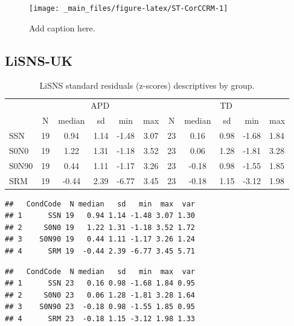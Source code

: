 \documentclass[a4paper, twoside]{templates/ociamthesis}
\begin{document}
\begin{figure}

{\centering \texttt{[image: \_main\_files/figure-latex/ST-CorCCRM-1]} 

}

\caption{Add caption here.}\label{fig:ST-CorCCRM}
\end{figure}

\hypertarget{lisns-uk}{%
\subsection{LiSNS-UK}\label{lisns-uk}}

\begin{table}

\caption{\label{tab:LiSNS-ztab}LiSNS standard residuals (z-scores) descriptives by group.}
\centering
\begin{tabular}[t]{lccccc|>{}ccccl}
\toprule
\multicolumn{1}{c}{ } & \multicolumn{5}{c}{APD} & \multicolumn{5}{c}{TD} \\
\cmidrule(l{3pt}r{3pt}){2-6} \cmidrule(l{3pt}r{3pt}){7-11}
 & N & median & sd & min & max & N & median & sd & min & max\\
\midrule
SSN & 19 & 0.94 & 1.14 & -1.48 & 3.07 & 23 & 0.16 & 0.98 & -1.68 & 1.84\\
S0N0 & 19 & 1.22 & 1.31 & -1.18 & 3.52 & 23 & 0.06 & 1.28 & -1.81 & 3.28\\
S0N90 & 19 & 0.44 & 1.11 & -1.17 & 3.26 & 23 & -0.18 & 0.98 & -1.55 & 1.85\\
SRM & 19 & -0.44 & 2.39 & -6.77 & 3.45 & 23 & -0.18 & 1.15 & -3.12 & 1.98\\
\bottomrule
\end{tabular}
\end{table}

\begin{verbatim}
##   CondCode  N median   sd   min  max  var
## 1      SSN 19   0.94 1.14 -1.48 3.07 1.30
## 2     S0N0 19   1.22 1.31 -1.18 3.52 1.72
## 3    S0N90 19   0.44 1.11 -1.17 3.26 1.24
## 4      SRM 19  -0.44 2.39 -6.77 3.45 5.71
\end{verbatim}

\begin{verbatim}
##   CondCode  N median   sd   min  max  var
## 1      SSN 23   0.16 0.98 -1.68 1.84 0.95
## 2     S0N0 23   0.06 1.28 -1.81 3.28 1.64
## 3    S0N90 23  -0.18 0.98 -1.55 1.85 0.95
## 4      SRM 23  -0.18 1.15 -3.12 1.98 1.33
\end{verbatim}
\end{document}
